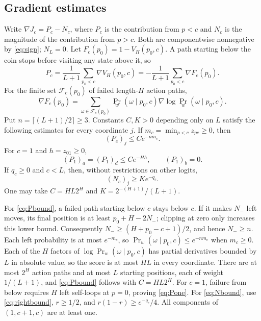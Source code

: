 \documentclass[11pt]{article}
\newcommand{\grad}{\nabla}
\begin{document}
\subsection{Gradient estimates}
Write $\grad J_c=P_c-N_c$, where $P_c$ is the contribution from $p<c$ and
$N_c$ is the magnitude of the contribution from $p>c$. Both are componentwise
nonnegative by \eqref{eq:sign}; $N_L=0$.
Let $F_c(p_0)=1-V_H(p_0,c)$. A path starting below the coin stops before
visiting any state above it, so
\[
 P_c=\frac1{L+1}\sum_{p_0<c}\grad V_H(p_0,c)
    =-\frac1{L+1}\sum_{p_0<c}\grad F_c(p_0).
\]
For the finite set $\mathcal F_c(p_0)$ of failed length-$H$ action paths,
\[
 \grad F_c(p_0)=\sum_{\omega\in\mathcal F_c(p_0)}
 \Pr_w(\omega\mid p_0,c)\grad\log\Pr_w(\omega\mid p_0,c).
\]
Put $n=\lceil(L+1)/2\rceil\ge3$. Constants $C,K>0$ depending only on $L$
satisfy the following estimates for every coordinate $j$.
If $m_c=\min_{p<c}z_{pc}\ge0$, then
\begin{equation}\label{eq:Pbound} (P_c)_j\le C e^{-nm_c}.\end{equation}
For $c=1$ and $h=z_{01}\ge0$,
\begin{equation}\label{eq:Pone}
 (P_1)_a=(P_1)_d\le Ce^{-Hh},\qquad (P_1)_b=0.
\end{equation}
If $q_c\ge0$ and $c<L$, then, without restrictions on other logits,
\begin{equation}\label{eq:Nbound} (N_c)_j\ge K e^{-q_c}.\end{equation}
One may take $C=HL2^H$ and $K=2^{-(H+1)}/(L+1)$.

For \eqref{eq:Pbound}, a failed path starting below $c$ stays below $c$.
If it makes $N_-$ left moves, its final position is at least $p_0+H-2N_-$;
clipping at zero only increases this lower bound. Consequently
$N_-\ge(H+p_0-c+1)/2$, and hence $N_-\ge n$. Each left probability is at
most $e^{-m_c}$, so $\Pr_w(\omega\mid p_0,c)\le e^{-nm_c}$ when $m_c\ge0$.
Each of the $H$ factors of $\log\Pr_w(\omega\mid p_0,c)$ has partial
derivatives bounded by $L$ in absolute value, so the score is at most $HL$
in every coordinate. There are at most $2^H$ action paths and at most $L$
starting positions, each of weight $1/(L+1)$, and \eqref{eq:Pbound} follows
with $C=HL2^H$.
For $c=1$, failure from
below requires $H$ left self-loops at $p=0$, proving \eqref{eq:Pone}.
For \eqref{eq:Nbound}, use \eqref{eq:rightbound}, $r\ge1/2$, and
$r(1-r)\ge e^{-q_c}/4$. All components of $(1,c+1,c)$ are at least one.
\end{document}
